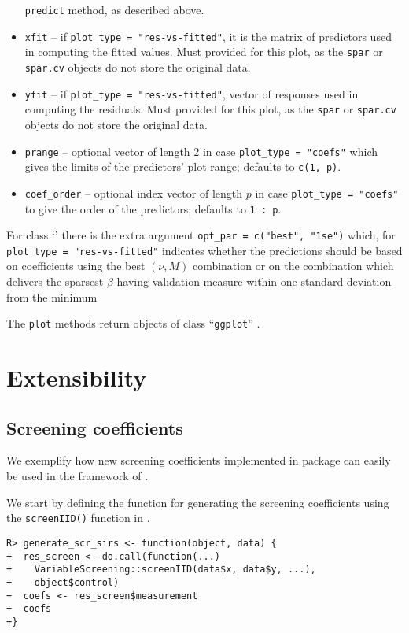 \documentclass[
  article]{jss}
\newcommand{\class}[1]{`\code{#1}'}
\begin{document}
\begin{itemize}
  \texttt{predict} method, as described above.
\item
  \texttt{xfit} -- if \texttt{plot\_type\ =\ "res-vs-fitted"}, it is the
  matrix of predictors used in computing the fitted values. Must
  provided for this plot, as the \texttt{spar} or \texttt{spar.cv}
  objects do not store the original data.
\item
  \texttt{yfit} -- if \texttt{plot\_type\ =\ "res-vs-fitted"}, vector of
  responses used in computing the residuals. Must provided for this
  plot, as the \texttt{spar} or \texttt{spar.cv} objects do not store
  the original data.
\item
  \texttt{prange} -- optional vector of length 2 in case
  \texttt{plot\_type\ =\ "coefs"} which gives the limits of the
  predictors' plot range; defaults to \texttt{c(1,\ p)}.
\item
  \texttt{coef\_order} -- optional index vector of length \(p\) in case
  \texttt{plot\_type\ =\ "coefs"} to give the order of the predictors;
  defaults to \texttt{1\ :\ p}.
\end{itemize}

For class \class{spar.cv} there is the extra argument
\texttt{opt\_par\ =\ c("best",\ "1se")} which, for
\texttt{plot\_type\ =\ "res-vs-fitted"} indicates whether the
predictions should be based on coefficients using the best \((\nu, M)\)
combination or on the combination which delivers the sparsest \(\beta\)
having validation measure within one standard deviation from the minimum

The \texttt{plot} methods return objects of class ``\texttt{ggplot}''
\citep{ggplotR}.

\section{Extensibility}\label{sec-extensibility}

\subsection{Screening coefficients}\label{sec-extensscrcoef}

We exemplify how new screening coefficients implemented in package
 can easily be used in the framework of
.

We start by defining the function for generating the screening
coefficients using the \texttt{screenIID()} function in
.

\begin{verbatim}
R> generate_scr_sirs <- function(object, data) {
+  res_screen <- do.call(function(...) 
+    VariableScreening::screenIID(data$x, data$y, ...), 
+    object$control)
+  coefs <- res_screen$measurement
+  coefs
+}
\end{verbatim}
\end{document}
